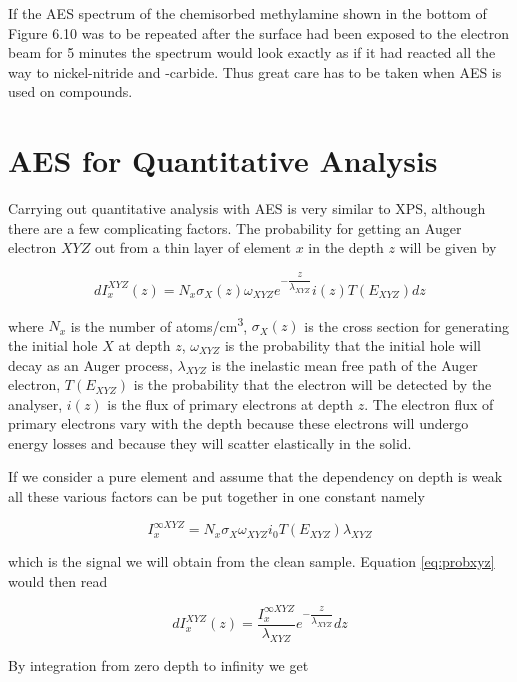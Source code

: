 If the AES spectrum of the chemisorbed  methylamine shown in the bottom of Figure 6.10 was to be repeated after the surface had been exposed to the electron beam for 5 minutes the spectrum would look exactly as if it had reacted all the way to nickel-nitride and -carbide. Thus great care has to be taken when AES is used on compounds.

\section{AES for Quantitative Analysis}
Carrying out quantitative analysis with AES is very similar to XPS, although there are a few complicating factors. The probability for getting an Auger electron $XYZ$ out from a thin layer of element $x$ in the depth $z$ will be given by

\begin{equation}\label{eq:probxyz}
dI^{XYZ}_x(z)=N_x\sigma_X(z)\omega_{XYZ}e^{-\dfrac{z}{\lambda_{XYZ}}}i(z)T(E_{XYZ})dz
\end{equation}
          
where $N_x$ is the number of \si{atoms/cm^3}, $\sigma_X(z)$ is the cross section for generating the initial hole $X$ at depth $z$, $\omega_{XYZ}$ is the probability that the initial hole will decay as an Auger process, $\lambda_{XYZ}$ is the inelastic mean free path of the Auger electron, $T(E_{XYZ})$ is the probability that the electron will be detected by the analyser, $i(z)$ is the flux of primary electrons at depth $z$. The electron flux of primary electrons vary with the depth because these electrons will undergo energy losses and because they will scatter elastically in the solid. 

If we consider a pure element and assume that the dependency on depth is weak all these various factors can be put together in one constant namely
          
\begin{equation}
I^{\infty XYZ}_x=N_x\sigma_X\omega_{XYZ}i_0T(E_{XYZ})\lambda_{XYZ}
\end{equation}

which is the signal we will obtain from the clean sample. Equation \eqref{eq:probxyz} would then read

\begin{equation}
dI_x^{XYZ}(z)=\frac{I^{\infty XYZ}_x}{\lambda_{XYZ}}e^{-\dfrac{z}{\lambda_{XYZ}}}dz
\end{equation}

By integration from zero depth to infinity we get

